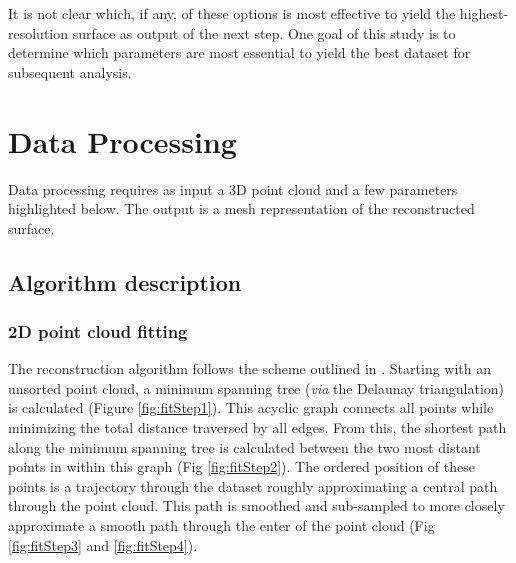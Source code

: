\documentclass[10pt,a4paper]{article}
\begin{document}
It is not clear which, if any, of these options is most effective to yield the highest-resolution surface as output of the next step.  One goal of this study is to determine which parameters are most essential to yield the best dataset for subsequent analysis.  

\section{Data Processing}

Data processing requires as input a 3D point cloud and a few parameters highlighted below.  The output is a mesh representation of the reconstructed surface. 

\subsection{Algorithm description}

\subsubsection{2D point cloud fitting}

The reconstruction algorithm follows the scheme outlined in \cite{lee2000curve}. Starting with an unsorted point cloud, a minimum spanning tree (\textit{via} the Delaunay triangulation) is calculated (Figure \ref{fig:fitStep1}).  This acyclic graph connects all points while minimizing the total distance traversed by all edges.  From this, the shortest path along the minimum spanning tree is calculated between the two most distant points in within this graph (Fig \ref{fig:fitStep2}). The ordered position of these points is a trajectory through the dataset roughly approximating a central path through the point cloud.  This path is smoothed and sub-sampled to more closely approximate a smooth path through the enter of the point cloud (Fig \ref{fig:fitStep3} and \ref{fig:fitStep4}).  
\end{document}
